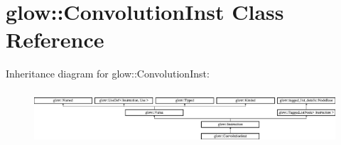 \hypertarget{classglow_1_1_convolution_inst}{}\section{glow\+:\+:Convolution\+Inst Class Reference}
\label{classglow_1_1_convolution_inst}
Inheritance diagram for glow\+:\+:Convolution\+Inst\+:\begin{figure}[H]
\begin{center}
\leavevmode
\includegraphics[height=1.991111cm]{classglow_1_1_convolution_inst}
\end{center}
\end{figure}

